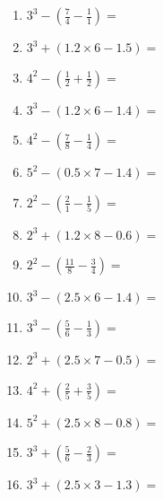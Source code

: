 \documentclass[12pt]{article}
\begin{document}
\begin{enumerate}
\item \large $ 3^{3} - (\frac{7}{4} - \frac{1}{1}) = $ \vspace{1.6cm}
\item \large $ 3^{3} + (1.2 \times 6 - 1.5) = $ \vspace{1.6cm}
\item \large $ 4^{2} - (\frac{1}{2} + \frac{1}{2}) = $ \vspace{1.6cm}
\item \large $ 3^{3} - (1.2 \times 6 - 1.4) = $ \vspace{1.6cm}
\item \large $ 4^{2} - (\frac{7}{8} - \frac{1}{4}) = $ \vspace{1.6cm}
\item \large $ 5^{2} - (0.5 \times 7 - 1.4) = $ \vspace{1.6cm}
\newpage
\item \large $ 2^{2} - (\frac{2}{1} - \frac{1}{5}) = $ \vspace{1.6cm}
\item \large $ 2^{3} + (1.2 \times 8 - 0.6) = $ \vspace{1.6cm}
\item \large $ 2^{2} - (\frac{11}{8} - \frac{3}{4}) = $ \vspace{1.6cm}
\item \large $ 3^{3} - (2.5 \times 6 - 1.4) = $ \vspace{1.6cm}
\item \large $ 3^{3} - (\frac{5}{6} - \frac{1}{3}) = $ \vspace{1.6cm}
\item \large $ 2^{3} + (2.5 \times 7 - 0.5) = $ \vspace{1.6cm}
\item \large $ 4^{2} + (\frac{2}{5} + \frac{3}{5}) = $ \vspace{1.6cm}
\item \large $ 5^{2} + (2.5 \times 8 - 0.8) = $ \vspace{1.6cm}
\item \large $ 3^{3} + (\frac{5}{6} - \frac{2}{3}) = $ \vspace{1.6cm}
\item \large $ 3^{3} + (2.5 \times 3 - 1.3) = $ \vspace{1.6cm}
\end{enumerate}\newpage
\end{document}
